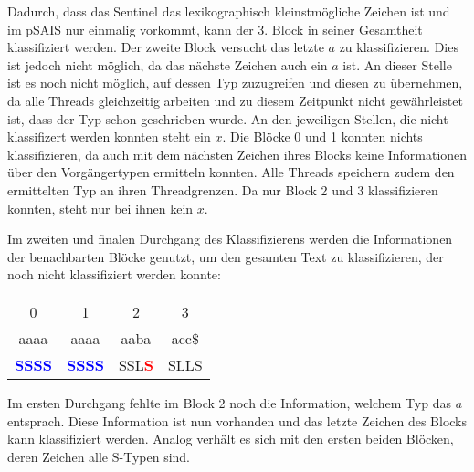 Dadurch, dass das Sentinel das lexikographisch kleinstmögliche Zeichen ist und im pSAIS nur einmalig vorkommt, kann der 3. Block in seiner Gesamtheit klassifiziert werden. Der zweite Block versucht das letzte $a$ zu klassifizieren. Dies ist jedoch nicht möglich, da das nächste Zeichen auch ein $a$ ist. An dieser Stelle ist es noch nicht möglich, auf dessen Typ zuzugreifen und diesen zu übernehmen, da alle Threads gleichzeitig arbeiten und zu diesem Zeitpunkt nicht gewährleistet ist, dass der Typ schon geschrieben wurde. An den jeweiligen Stellen, die nicht klassifizert werden konnten steht ein $x$. Die Blöcke 0 und 1 konnten nichts klassifizieren, da auch mit dem nächsten Zeichen ihres Blocks keine Informationen über den Vorgängertypen ermitteln konnten. Alle Threads speichern zudem den ermittelten Typ an ihren Threadgrenzen. Da nur Block 2 und 3 klassifizieren konnten, steht nur bei ihnen kein $x$.

Im zweiten und finalen Durchgang des Klassifizierens werden die Informationen der benachbarten Blöcke genutzt, um den gesamten Text zu klassifizieren, der noch nicht klassifiziert werden konnte:

\begin{center}
	\begin{tabular}{c|c|c|c}      
		           0     	&             1         &           2           &             3    \\ 
          	aaaa     		&          aaaa         &        aaba           &          acc\$    \\            
\textbf{\textcolor{blue}{S}}\textbf{\textcolor{blue}{S}}\textbf{\textcolor{blue}{S}}\textbf{\textcolor{blue}{S}} &  \textbf{\textcolor{blue}{S}}\textbf{\textcolor{blue}{S}}\textbf{\textcolor{blue}{S}}\textbf{\textcolor{blue}{S}} & SSL\textbf{\textcolor{red}{S}}  & SLLS     \\             	       
	\end{tabular}
\end{center}

Im ersten Durchgang fehlte im Block 2 noch die Information, welchem Typ das $a$ entsprach. Diese Information ist nun vorhanden und das letzte Zeichen des Blocks kann klassifiziert werden. Analog verhält es sich mit den ersten beiden Blöcken, deren Zeichen alle S-Typen sind.

